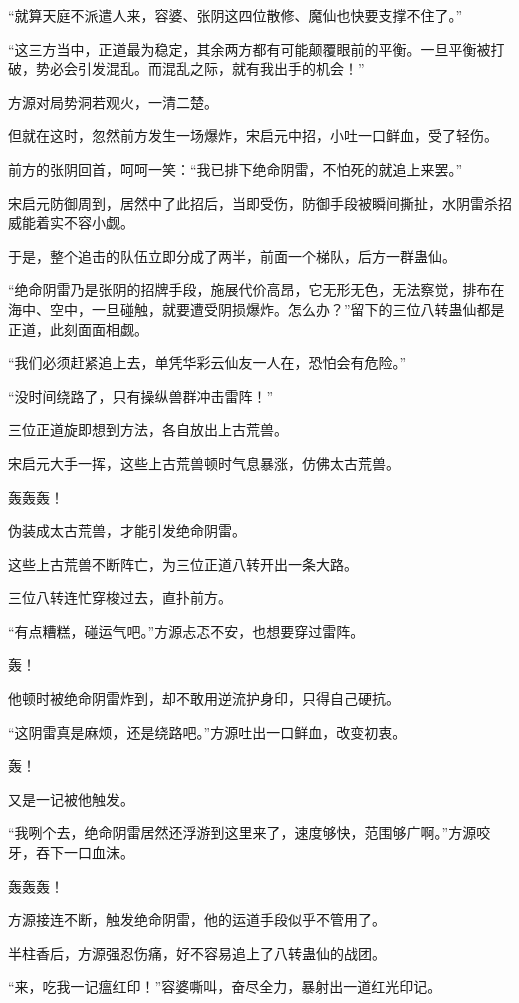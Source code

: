\begin{this_body}
“就算天庭不派遣人来，容婆、张阴这四位散修、魔仙也快要支撑不住了。”

“这三方当中，正道最为稳定，其余两方都有可能颠覆眼前的平衡。一旦平衡被打破，势必会引发混乱。而混乱之际，就有我出手的机会！”

方源对局势洞若观火，一清二楚。

但就在这时，忽然前方发生一场爆炸，宋启元中招，小吐一口鲜血，受了轻伤。

前方的张阴回首，呵呵一笑：“我已排下绝命阴雷，不怕死的就追上来罢。”

宋启元防御周到，居然中了此招后，当即受伤，防御手段被瞬间撕扯，水阴雷杀招威能着实不容小觑。

于是，整个追击的队伍立即分成了两半，前面一个梯队，后方一群蛊仙。

“绝命阴雷乃是张阴的招牌手段，施展代价高昂，它无形无色，无法察觉，排布在海中、空中，一旦碰触，就要遭受阴损爆炸。怎么办？”留下的三位八转蛊仙都是正道，此刻面面相觑。

“我们必须赶紧追上去，单凭华彩云仙友一人在，恐怕会有危险。”

“没时间绕路了，只有操纵兽群冲击雷阵！”

三位正道旋即想到方法，各自放出上古荒兽。

宋启元大手一挥，这些上古荒兽顿时气息暴涨，仿佛太古荒兽。

轰轰轰！

伪装成太古荒兽，才能引发绝命阴雷。

这些上古荒兽不断阵亡，为三位正道八转开出一条大路。

三位八转连忙穿梭过去，直扑前方。

“有点糟糕，碰运气吧。”方源忐忑不安，也想要穿过雷阵。

轰！

他顿时被绝命阴雷炸到，却不敢用逆流护身印，只得自己硬抗。

“这阴雷真是麻烦，还是绕路吧。”方源吐出一口鲜血，改变初衷。

轰！

又是一记被他触发。

“我咧个去，绝命阴雷居然还浮游到这里来了，速度够快，范围够广啊。”方源咬牙，吞下一口血沫。

轰轰轰！

方源接连不断，触发绝命阴雷，他的运道手段似乎不管用了。

半柱香后，方源强忍伤痛，好不容易追上了八转蛊仙的战团。

“来，吃我一记瘟红印！”容婆嘶叫，奋尽全力，暴射出一道红光印记。


\end{this_body}
